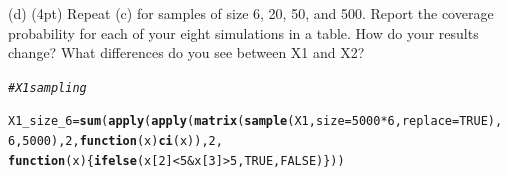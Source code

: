 \documentclass{article}\usepackage[]{graphicx}\usepackage[]{color}
\makeatletter
\newcommand{\hlnum}[1]{\textcolor[rgb]{0.686,0.059,0.569}{#1}}%
\newcommand{\hlcom}[1]{\textcolor[rgb]{0.678,0.584,0.686}{\textit{#1}}}%
\newcommand{\hlopt}[1]{\textcolor[rgb]{0,0,0}{#1}}%
\newcommand{\hlstd}[1]{\textcolor[rgb]{0.345,0.345,0.345}{#1}}%
\newcommand{\hlkwa}[1]{\textcolor[rgb]{0.161,0.373,0.58}{\textbf{#1}}}%
\newcommand{\hlkwb}[1]{\textcolor[rgb]{0.69,0.353,0.396}{#1}}%
\newcommand{\hlkwc}[1]{\textcolor[rgb]{0.333,0.667,0.333}{#1}}%
\newcommand{\hlkwd}[1]{\textcolor[rgb]{0.737,0.353,0.396}{\textbf{#1}}}%
\newenvironment{kframe}{%
 \def\at@end@of@kframe{}%
 \ifinner\ifhmode%
  \def\at@end@of@kframe{\end{minipage}}%
  \begin{minipage}{\columnwidth}%
 \fi\fi%
 \def\FrameCommand##1{\hskip\@totalleftmargin \hskip-\fboxsep
 \colorbox{shadecolor}{##1}\hskip-\fboxsep
     \hskip-\linewidth \hskip-\@totalleftmargin \hskip\columnwidth}%
 \MakeFramed {\advance\hsize-\width
   \@totalleftmargin\z@ \linewidth\hsize
   \@setminipage}}%
 {\par\unskip\endMakeFramed%
 \at@end@of@kframe}
\newenvironment{knitrout}{}{} %
\makeatother
\begin{document}
(d) (4pt) Repeat (c) for samples of size 6, 20, 50, and 500. Report the coverage probability for each of your eight simulations in a table. How do your results change? What differences do you see between X1 and X2?

\begin{knitrout}
\color{fgcolor}\begin{kframe}
\begin{alltt}
\hlcom{#X1 sampling }

\hlstd{X1_size_6} \hlkwb{=} \hlkwd{sum}\hlstd{(}\hlkwd{apply}\hlstd{(}\hlkwd{apply}\hlstd{(}\hlkwd{matrix}\hlstd{(}\hlkwd{sample}\hlstd{(X1,} \hlkwc{size} \hlstd{=} \hlnum{5000} \hlopt{*}\hlnum{6}\hlstd{,} \hlkwc{replace} \hlstd{=} \hlnum{TRUE}\hlstd{),}
                                   \hlnum{6}\hlstd{,}\hlnum{5000}\hlstd{),} \hlnum{2}\hlstd{,} \hlkwa{function}\hlstd{(}\hlkwc{x}\hlstd{)} \hlkwd{ci}\hlstd{(x)),} \hlnum{2}\hlstd{,}
                      \hlkwa{function}\hlstd{(}\hlkwc{x}\hlstd{)\{}\hlkwd{ifelse}\hlstd{(x[}\hlnum{2}\hlstd{]} \hlopt{<}\hlnum{5} \hlopt{&} \hlstd{x[}\hlnum{3}\hlstd{]} \hlopt{>} \hlnum{5}\hlstd{,} \hlnum{TRUE}\hlstd{,} \hlnum{FALSE}\hlstd{)\}))}


\end{alltt}
\end{kframe}
\end{knitrout}
\end{document}
